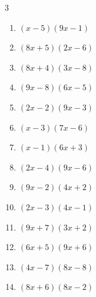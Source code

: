 \begin{multicols}{3}
\begin{enumerate}

  \item $(x-5)(9x-1)$


  \item $(8x+5)(2x-6)$


  \item $(8x+4)(3x-8)$


  \item $(9x-8)(6x-5)$


  \item $(2x-2)(9x-3)$


  \item $(x-3)(7x-6)$


  \item $(x-1)(6x+3)$


  \item $(2x-4)(9x-6)$


  \item $(9x-2)(4x+2)$


\columnbreak %

\resetques

  \item $(2x-3)(4x-1)$


  \item $(9x+7)(3x+2)$


  \item $(6x+5)(9x+6)$


  \item $(4x-7)(8x-8)$


  \item $(8x+6)(8x-2)$


\end{enumerate}
\end{multicols}
